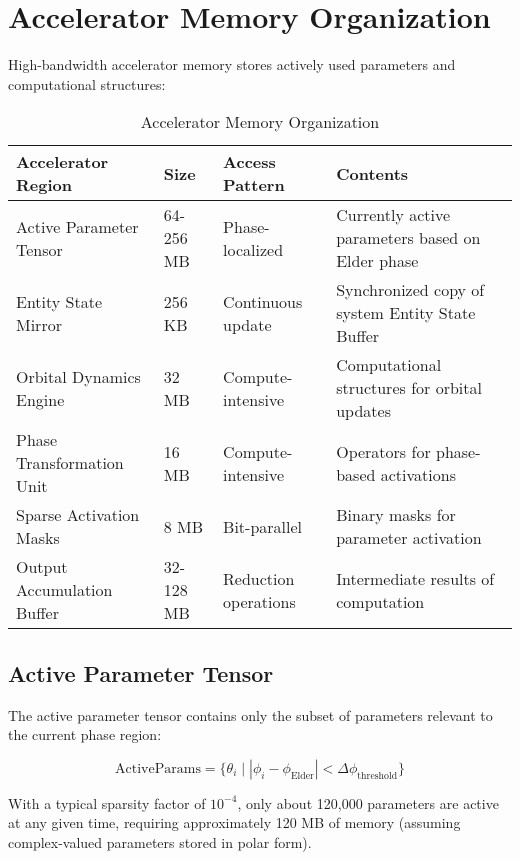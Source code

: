 \section{Accelerator Memory Organization}

High-bandwidth accelerator memory stores actively used parameters and computational structures:

\begin{table}[h]
\centering
\small
\begin{tabular}{|p{3.5cm}|p{2.5cm}|p{3.2cm}|p{4.3cm}|}
\hline
\textbf{Accelerator Region} & \textbf{Size} & \textbf{Access Pattern} & \textbf{Contents} \\
\hline
Active Parameter Tensor & 64-256 MB & Phase-localized & Currently active parameters based on Elder phase \\
\hline
Entity State Mirror & 256 KB & Continuous update & Synchronized copy of system Entity State Buffer \\
\hline
Orbital Dynamics Engine & 32 MB & Compute-intensive & Computational structures for orbital updates \\
\hline
Phase Transformation Unit & 16 MB & Compute-intensive & Operators for phase-based activations \\
\hline
Sparse Activation Masks & 8 MB & Bit-parallel & Binary masks for parameter activation \\
\hline
Output Accumulation Buffer & 32-128 MB & Reduction operations & Intermediate results of computation \\
\hline
\end{tabular}
\caption{Accelerator Memory Organization}
\end{table}

\subsection{Active Parameter Tensor}

The active parameter tensor contains only the subset of parameters relevant to the current phase region:

\begin{equation}
\text{ActiveParams} = \{ \theta_i \mid |\phi_i - \phi_{\text{Elder}}| < \Delta\phi_{\text{threshold}} \}
\end{equation}

With a typical sparsity factor of $10^{-4}$, only about 120,000 parameters are active at any given time, requiring approximately 120 MB of memory (assuming complex-valued parameters stored in polar form).

